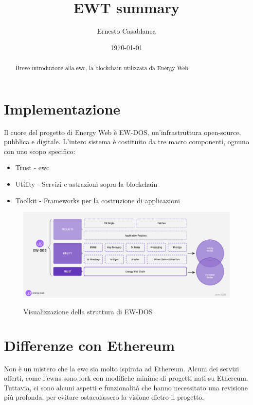 \documentclass[12pt, letterpaper, twoside]{article}
\title{EWT summary}
\author{Ernesto Casablanca}
\date{\today}
\begin{document}

\tableofcontents

\newpage

\begin{abstract}
    Breve introduzione alla \gls{ewc}, la blockchain utilizzata da Energy Web
\end{abstract}

\section{Implementazione}
Il cuore del progetto di Energy Web è EW-DOS, un'infrastruttura open-source, pubblica e digitale.
L'intero sistema è costituito da tre macro componenti, ognuno con uno scopo specifico:

\begin{itemize}
    \item Trust - \gls{ewc}
    \item Utility - Servizi e astrazioni sopra la blockchain
    \item Toolkit - Frameworks per la costruzione di applicazioni
\end{itemize}

\begin{figure}[h]
    \includegraphics[width=13cm]{ew-dos}
    \centering
    \label{ew-dos}
    \caption{Visualizzazione della struttura di EW-DOS \cite{img:ew-dos}}
\end{figure}

\newpage

\section{Differenze con Ethereum}
Non è un mistero che la \gls{ewc} sia molto ispirata ad Ethereum.
Alcuni dei servizi offerti, come l'\gls{ewns} sono fork con modifiche minime di progetti nati su Ethereum. \\
Tuttavia, ci sono alcuni aspetti e funzionalità che hanno necessitato una revisione più profonda, per evitare ostacolassero la visione dietro il progetto. \\
\end{document}
